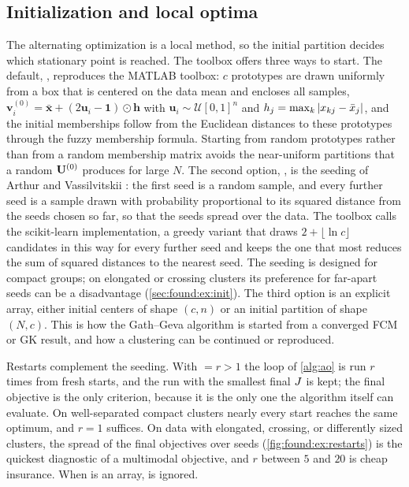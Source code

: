 \subsection{Initialization and local optima}\label{sec:found:init}

The alternating optimization is a local method, so the initial partition decides which stationary point is reached. The toolbox offers three ways to start. The default, , reproduces the MATLAB toolbox: $c$ prototypes are drawn uniformly from a box that is centered on the data mean and encloses all samples, $\mathbf{v}_i^{(0)}=\bar{\mathbf{x}}+(2\mathbf{u}_i-\mathbf{1})\odot\mathbf{h}$ with $\mathbf{u}_i\sim\mathcal{U}[0,1]^n$ and $h_j=\max_k\left\lvert x_{kj}-\bar{x}_j \right\rvert$, and the initial memberships follow from the Euclidean distances to these prototypes through the fuzzy membership formula. Starting from random prototypes rather than from a random membership matrix avoids the near-uniform partitions that a random $\mathbf{U}^{(0)}$ produces for large $N$. The second option, , is the seeding of Arthur and Vassilvitskii \cite{arthur:2007:kmeanspp}: the first seed is a random sample, and every further seed is a sample drawn with probability proportional to its squared distance from the seeds chosen so far, so that the seeds spread over the data. The toolbox calls the scikit-learn implementation, a greedy variant that draws $2+\lfloor\ln c\rfloor$ candidates in this way for every further seed and keeps the one that most reduces the sum of squared distances to the nearest seed. The seeding is designed for compact groups; on elongated or crossing clusters its preference for far-apart seeds can be a disadvantage (\cref{sec:found:ex:init}). The third option is an explicit array, either initial centers of shape $(c,n)$ or an initial partition of shape $(N,c)$. This is how the Gath--Geva algorithm is started from a converged FCM or GK result, and how a clustering can be continued or reproduced.

Restarts complement the seeding. With $=r>1$ the loop of \cref{alg:ao} is run $r$ times from fresh starts, and the run with the smallest final $J$ is kept; the final objective is the only criterion, because it is the only one the algorithm itself can evaluate. On well-separated compact clusters nearly every start reaches the same optimum, and $r=1$ suffices. On data with elongated, crossing, or differently sized clusters, the spread of the final objectives over seeds (\cref{fig:found:ex:restarts}) is the quickest diagnostic of a multimodal objective, and $r$ between $5$ and $20$ is cheap insurance. When  is an array,  is ignored.

